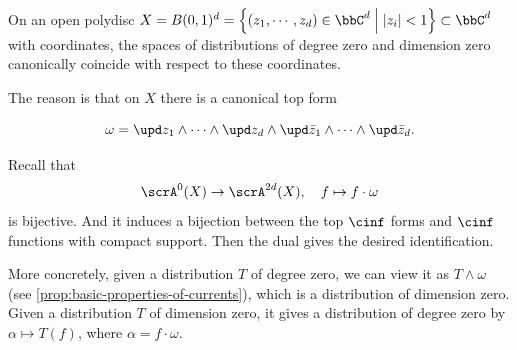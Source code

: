 \begin{remark}[label=\labelNFM{rmk:degree-and-dimension-coincide-on-coordinate-ball}, status=draft, tag=0000000]
	On an open polydisc $X = B(0,1)^d = \left\{ (z_1,\cdots,z_d) \in \bbC^d \;\middle|\; |z_i| < 1 \right\} \subset \bbC^d$ with coordinates, the spaces of distributions of degree zero and dimension zero canonically coincide with respect to these coordinates.

	The reason is that on $X$ there is a canonical top form

\[ \omega = \upd z_1 \wedge \cdots \wedge \upd z_d \wedge \upd\bar z_1 \wedge \cdots \wedge \upd\bar z_d. \]

	Recall that
	\[ \scrA^0(X) \to \scrA^{2d}(X), \quad f \mapsto f \cdot \omega \]
	is bijective.
	And it induces a bijection between the top $\cinf$ forms and $\cinf$ functions with compact support.
	Then the dual gives the desired identification.

	More concretely, given a distribution $T$ of degree zero, we can view it as $T \wedge \omega$ (see \cref{prop:basic-properties-of-currents}), which is a distribution of dimension zero.
	Given a distribution $T$ of dimension zero, it gives a distribution of degree zero by $\alpha \mapsto T(f)$, where $\alpha = f \cdot \omega$.
	\Yang{}
\end{remark}

